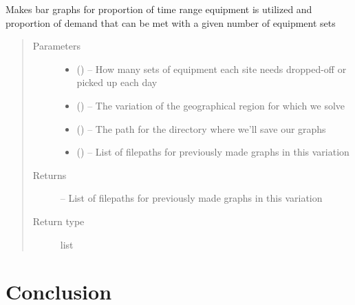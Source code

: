 \documentclass[letterpaper,10pt,english]{sphinxmanual}
\begin{document}
\begin{fulllineitems}
\label{\detokenize{reporting:reporting.equipment_graph_maker}}
Makes bar graphs for proportion of time range equipment is utilized and
proportion of demand that can be met with a given number of equipment sets
\begin{quote}\begin{description}
\item[{Parameters}] \leavevmode\begin{itemize}
\item {} 
 () -- How many sets of equipment each site needs dropped-off or picked up
each day

\item {} 
 () -- The variation of the geographical region for which we solve

\item {} 
 () -- The path for the directory where we'll save our graphs

\item {} 
 () -- List of filepaths for previously made graphs in this variation

\end{itemize}

\item[{Returns}] \leavevmode
{} -- List of filepaths for previously made graphs in this variation

\item[{Return type}] \leavevmode
list

\end{description}\end{quote}

\end{fulllineitems}



\chapter{Conclusion}
\label{\detokenize{conclusion:id1}}\label{\detokenize{conclusion::doc}}\label{\detokenize{conclusion:conclusion}}
\end{document}

